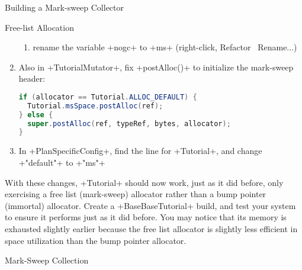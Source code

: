 \begin{section}{Building a Mark-sweep Collector}
\begin{subsection}{Free-list Allocation}
\begin{enumerate}
\begin{enumerate}
      \item rename the variable \spverb+nogc+ to \spverb+ms+ (right-click, Refactor \textrightarrow\ Rename...)
    \end{enumerate}
  \item Also in \spverb+TutorialMutator+, fix \spverb+postAlloc()+ to initialize the mark-sweep header:
\begin{lstlisting}[language=Java] 
if (allocator == Tutorial.ALLOC_DEFAULT) {
  Tutorial.msSpace.postAlloc(ref);
} else {
  super.postAlloc(ref, typeRef, bytes, allocator);
}
\end{lstlisting}
  \item In \spverb+PlanSpecificConfig+, find the line for \spverb+Tutorial+, and change \spverb+"default"+ to \spverb+"ms"+
\end{enumerate}

With these changes, \spverb+Tutorial+ should now work, just as it did before, only exercising a free list (mark-sweep) allocator rather than a bump pointer (immortal) allocator. Create a \spverb+BaseBaseTutorial+ build, and test your system to ensure it performs just as it did before. You may notice that its memory is exhausted slightly earlier because the free list allocator is slightly less efficient in space utilization than the bump pointer allocator.

\end{subsection}

\begin{subsection}{Mark-Sweep Collection}


\end{subsection}
\end{section}

